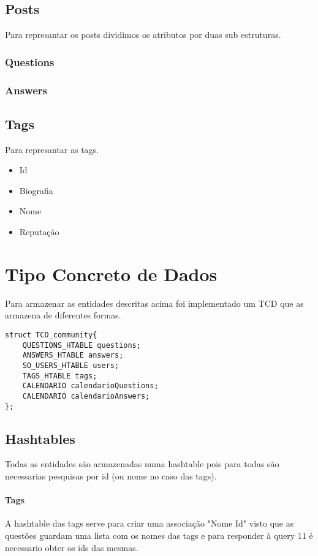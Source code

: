 \documentclass[10pt,a4paper]{report}
\begin{document}
    \section{Posts}
    Para represantar os posts dividimos os atributos por duas sub
    estruturas.
        \subsection{Questions}
        \begin{itemize}
            
        \end{itemize}
        \subsection{Answers}
        \begin{itemize}
            
        \end{itemize}
    \section{Tags}
    Para represantar as tags.
    \begin{itemize}
        \item Id
        \item Biografia
        \item Nome
        \item Reputação
\end{itemize}


\chapter{Tipo Concreto de Dados}
    Para armazenar as entidades descritas acima foi implementado um TCD que
    as armazena de diferentes formas.
    \begin{verbatim}
struct TCD_community{
    QUESTIONS_HTABLE questions;
    ANSWERS_HTABLE answers;
    SO_USERS_HTABLE users;
    TAGS_HTABLE tags;
    CALENDARIO calendarioQuestions;
    CALENDARIO calendarioAnswers;
};
    \end{verbatim}
    \section{Hashtables}
        Todas as entidades são armazenadas numa hashtable pois para todas são
        necessarias pesquisas por id (ou nome no caso das tags).
        \subsubsection{Tags}
        A hashtable das tags serve para criar uma associação "Nome Id" visto que
        as questões guardam uma lista com os nomes das tags e para responder à
        query 11 é necessario obter os ids das mesmas.
\end{document}
